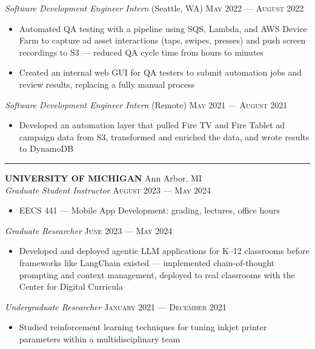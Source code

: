 \documentclass[10pt]{article}
\begin{document}
\vspace{1pt}
\textit{Software Development Engineer Intern} (Seattle, WA) \hfill \textsc{May 2022 --- August 2022}
\begin{itemize}[leftmargin=*, nosep, topsep=2pt, parsep=1pt]
  \item Automated QA testing with a pipeline using SQS, Lambda, and AWS Device Farm to capture ad asset interactions (taps, swipes, presses) and push screen recordings to S3 --- reduced QA cycle time from hours to minutes
  \item Created an internal web GUI for QA testers to submit automation jobs and review results, replacing a fully manual process
\end{itemize}

\vspace{1pt}
\textit{Software Development Engineer Intern} (Remote) \hfill \textsc{May 2021 --- August 2021}
\begin{itemize}[leftmargin=*, nosep, topsep=2pt, parsep=1pt]
  \item Developed an automation layer that pulled Fire TV and Fire Tablet ad campaign data from S3, transformed and enriched the data, and wrote results to DynamoDB
\end{itemize}

\rule{\textwidth}{0.2pt}

\textbf{UNIVERSITY OF MICHIGAN} \hfill Ann Arbor, MI\\[1pt]
\textit{Graduate Student Instructor} \hfill \textsc{August 2023 --- May 2024}
\begin{itemize}[leftmargin=*, nosep, topsep=2pt, parsep=1pt]
  \item EECS 441 --- Mobile App Development: grading, lectures, office hours
\end{itemize}

\vspace{1pt}
\textit{Graduate Researcher} \hfill \textsc{June 2023 --- May 2024}
\begin{itemize}[leftmargin=*, nosep, topsep=2pt, parsep=1pt]
  \item Developed and deployed agentic LLM applications for K--12 classrooms before frameworks like LangChain existed --- implemented chain-of-thought prompting and context management, deployed to real classrooms with the Center for Digital Curricula
\end{itemize}

\vspace{1pt}
\textit{Undergraduate Researcher} \hfill \textsc{January 2021 --- December 2021}
\begin{itemize}[leftmargin=*, nosep, topsep=2pt, parsep=1pt]
  \item Studied reinforcement learning techniques for tuning inkjet printer parameters within a multidisciplinary team
\end{itemize}
\end{document}
